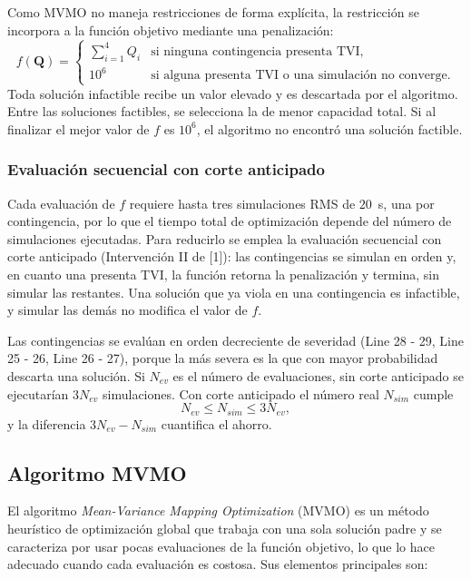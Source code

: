 Como MVMO no maneja restricciones de forma explícita, la restricción se incorpora a la función objetivo mediante una penalización:
\begin{equation}
    f(\mathbf{Q}) =
    \begin{cases}
        \displaystyle\sum_{i=1}^{4} Q_i & \text{si ninguna contingencia presenta TVI}, \\[2mm]
        10^{6} & \text{si alguna presenta TVI o una simulación no converge}.
    \end{cases}
\end{equation}
Toda solución infactible recibe un valor elevado y es descartada por el algoritmo. Entre las soluciones factibles, se selecciona la de menor capacidad total. Si al finalizar el mejor valor de $f$ es $10^6$, el algoritmo no encontró una solución factible.

\subsubsection{Evaluación secuencial con corte anticipado}

Cada evaluación de $f$ requiere hasta tres simulaciones RMS de $20$~s, una por contingencia, por lo que el tiempo total de optimización depende del número de simulaciones ejecutadas. Para reducirlo se emplea la evaluación secuencial con corte anticipado (Intervención II de [1]): las contingencias se simulan en orden y, en cuanto una presenta TVI, la función retorna la penalización y termina, sin simular las restantes. Una solución que ya viola en una contingencia es infactible, y simular las demás no modifica el valor de $f$.

Las contingencias se evalúan en orden decreciente de severidad (Line 28 - 29, Line 25 - 26, Line 26 - 27), porque la más severa es la que con mayor probabilidad descarta una solución. Si $N_{ev}$ es el número de evaluaciones, sin corte anticipado se ejecutarían $3N_{ev}$ simulaciones. Con corte anticipado el número real $N_{sim}$ cumple
\begin{equation}
    N_{ev} \le N_{sim} \le 3N_{ev},
\end{equation}
y la diferencia $3N_{ev} - N_{sim}$ cuantifica el ahorro.

\subsection{Algoritmo MVMO}

El algoritmo \textit{Mean-Variance Mapping Optimization} (MVMO) es un método heurístico de optimización global que trabaja con una sola solución padre y se caracteriza por usar pocas evaluaciones de la función objetivo, lo que lo hace adecuado cuando cada evaluación es costosa. Sus elementos principales son:

